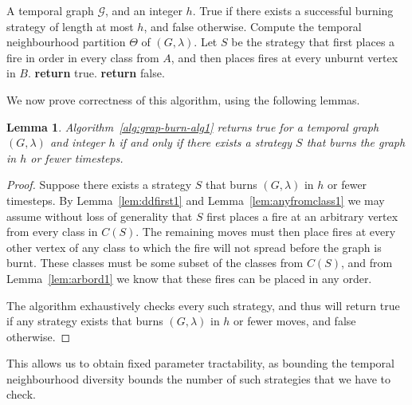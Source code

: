 \documentclass[preprint,12pt]{elsarticle}
\newtheorem{lemma}{Lemma}
\begin{document}
\begin{algorithm}\caption{TND Graph Burning Algorithm}\label{alg:grap-burn-alg1}
    \begin{algorithmic}[1]
    \Require A temporal graph $\mathcal{G}$, and an integer $h$.
    \Ensure True if there exists a successful burning strategy of length at most $h$, and false otherwise.
    \State Compute the temporal neighbourhood partition $\Theta$ of $(G, \lambda)$.
            \State Let $S$ be the strategy that first places a fire in order in every class from $A$, and then places fires at every unburnt vertex in $B$.
            \State \textbf{return} true.
            \EndIf
            \EndFor
        \EndFor
    \EndFor
    \State \textbf{return} false.
    \end{algorithmic}
\end{algorithm}

We now prove correctness of this algorithm, using the following lemmas.

\begin{lemma}
    Algorithm~\ref{alg:grap-burn-alg1} returns true for a temporal graph $(G, \lambda)$ and integer $h$ if and only if there exists a strategy $S$ that burns the graph in $h$ or fewer timesteps.
\end{lemma}
\begin{proof}
    Suppose there exists a strategy $S$ that burns $(G, \lambda)$ in $h$ or fewer timesteps. By Lemma~\ref{lem:ddfirst1} and Lemma~\ref{lem:anyfromclass1} we may assume without loss of generality that $S$ first places a fire at an arbitrary vertex from every class in $C(S)$. The remaining moves must then place fires at every other vertex of any class to which the fire will not spread before the graph is burnt. These classes must be some subset of the classes from $C(S)$, and from Lemma~\ref{lem:arbord1} we know that these fires can be placed in any order.

    The algorithm exhaustively checks every such strategy, and thus will return true if any strategy exists that burns $(G, \lambda)$ in $h$ or fewer moves, and false otherwise.
\end{proof}

This allows us to obtain fixed parameter tractability, as bounding the temporal neighbourhood diversity bounds the number of such strategies that we have to check.
\end{document}
